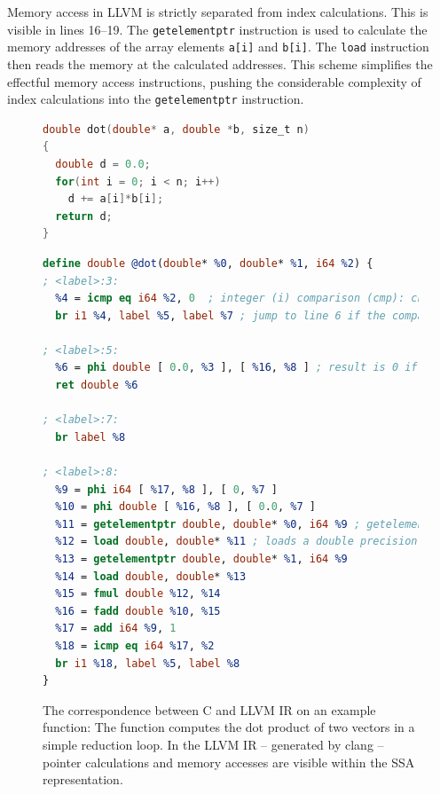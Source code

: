     Memory access in LLVM is strictly separated from index calculations.
    This is visible in lines 16--19.
    The {\tt getelementptr} instruction is used to calculate the memory
    addresses of the array elements {\tt a[i]} and {\tt b[i]}.
    The {\tt load} instruction then reads the memory at the calculated
    addresses.
    This scheme simplifies the effectful memory access instructions, pushing the
    considerable complexity of index calculations into the {\tt getelementptr}
    instruction.

\begin{figure}[p]
\vspace{-0.09cm}
\begin{lstlisting}[language=C,captionpos=t,title=
   {{\bf(a)} {} C source code of a {\tt dot} product function implementation:
    \leftskip=0pt}]
double dot(double* a, double *b, size_t n)
{
  double d = 0.0;
  for(int i = 0; i < n; i++)
    d += a[i]*b[i];
  return d;
}
\end{lstlisting}
\vspace{-0.09cm}
\begin{lstlisting}[language=LLVM,breaklines=true,captionpos=t,title=
   {{\bf(b)} {} LLVM IR representation of the same {\tt dot} product function:
    \leftskip=0pt}]
define double @dot(double* %0, double* %1, i64 %2) {
; <label>:3:
  %4 = icmp eq i64 %2, 0  ; integer (i) comparison (cmp): check if register %2 is equal (eq) to constant zero
  br i1 %4, label %5, label %7 ; jump to line 6 if the comparison held, otherwise jump to line 10 instead

; <label>:5:
  %6 = phi double [ 0.0, %3 ], [ %16, %8 ] ; result is 0 if the phi node was reached from line 4, otherwise it was reached from line 24 and the result is taken from %16
  ret double %6

; <label>:7:
  br label %8

; <label>:8:
  %9 = phi i64 [ %17, %8 ], [ 0, %7 ]
  %10 = phi double [ %16, %8 ], [ 0.0, %7 ]
  %11 = getelementptr double, double* %0, i64 %9 ; getelementpointer calculates memory addresses, here it computes the address of the %9-th value in the array %0
  %12 = load double, double* %11 ; loads a double precision floating point value from the calculated address
  %13 = getelementptr double, double* %1, i64 %9
  %14 = load double, double* %13
  %15 = fmul double %12, %14
  %16 = fadd double %10, %15
  %17 = add i64 %9, 1
  %18 = icmp eq i64 %17, %2
  br i1 %18, label %5, label %8
}
\end{lstlisting}
\caption{The correspondence between C and LLVM IR on an example function:
         The function computes the dot product of two vectors in a simple
         reduction loop.
         In the LLVM IR -- generated by clang -- pointer calculations and memory
         accesses are visible within the SSA representation.}
\label{llvmirexample}
\end{figure}

